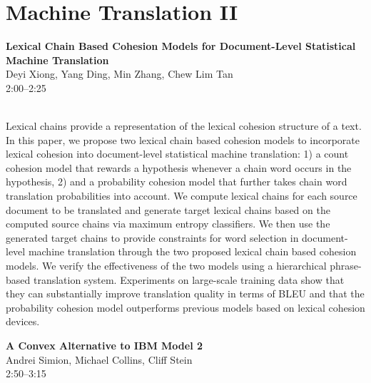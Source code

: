 \documentclass[twoside,makeidx]{book}
\begin{document}
\section{Machine Translation II}
\vspace{-1em}
\par\vspace{2em}\noindent%
\begin{minipage}{\linewidth}%
\begin{center}
\textbf{\normalsize Lexical Chain Based Cohesion Models for Document-Level Statistical Machine Translation}\\
\normalsize  Deyi Xiong,  Yang Ding,  Min Zhang,  Chew Lim Tan\\
{\small 2:00--2:25}\\
\end{center}
\end{minipage}\\[0.5em]
\nopagebreak%
\noindent%
{\small Lexical chains provide a representation of the lexical cohesion structure of a text. In this paper, we propose two lexical chain based cohesion models to incorporate lexical cohesion into document-level statistical machine translation: 1) a count cohesion model that rewards a hypothesis whenever a chain word occurs in the hypothesis, 2) and a probability cohesion model that further takes chain word translation probabilities into account. We compute lexical chains for each source document to be translated and generate target lexical chains based on the computed source chains via maximum entropy classifiers. We then use the generated target chains to provide constraints for word selection in document-level machine translation through the two proposed lexical chain based cohesion models. We verify the effectiveness of the two models using a hierarchical phrase-based translation system. Experiments on large-scale training data show that they can substantially improve translation quality in terms of BLEU and that the probability cohesion model outperforms previous models based on lexical cohesion devices.}
\par\vspace{2em}\noindent%
\begin{minipage}{\linewidth}%
\begin{center}
\textbf{\normalsize A Convex Alternative to IBM Model 2}\\
\normalsize  Andrei Simion,  Michael Collins,  Cliff Stein\\
{\small 2:50--3:15}\\
\end{center}
\end{minipage}\\[0.5em]
\end{document}
